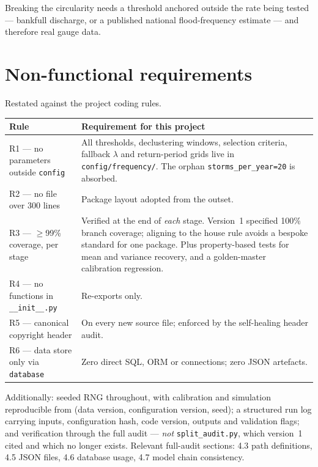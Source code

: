 \documentclass[11pt]{article}
\begin{document}
Breaking the circularity needs a threshold anchored outside the rate being
tested --- bankfull discharge, or a published national flood-frequency estimate
--- and therefore real gauge data.

\section{Non-functional requirements}

Restated against the project coding rules.

\begin{longtable}{@{}p{}p{}@{}}
\toprule
\textbf{Rule} & \textbf{Requirement for this project} \\
\midrule
\endhead
R1 --- no parameters outside \texttt{config} & All thresholds, declustering
windows, selection criteria, fallback $\lambda$ and return-period grids live in
\texttt{config/frequency/}. The orphan \texttt{storms\_per\_year=20} is
absorbed. \\
\addlinespace
R2 --- no file over 300 lines & Package layout adopted from the outset. \\
\addlinespace
R3 --- $\geq$99\% coverage, per stage & Verified at the end of \emph{each} stage.
Version~1 specified 100\% branch coverage; aligning to the house rule avoids a
bespoke standard for one package. Plus property-based tests for mean and
variance recovery, and a golden-master calibration regression. \\
\addlinespace
R4 --- no functions in \texttt{\_\_init\_\_.py} & Re-exports only. \\
\addlinespace
R5 --- canonical copyright header & On every new source file; enforced by the
self-healing header audit. \\
\addlinespace
R6 --- data store only via \texttt{database} & Zero direct SQL, ORM or
connections; zero JSON artefacts. \\
\bottomrule
\end{longtable}

\noindent Additionally: seeded RNG throughout, with calibration and simulation
reproducible from (data version, configuration version, seed); a structured run
log carrying inputs, configuration hash, code version, outputs and validation
flags; and verification through the full audit --- \emph{not}
\texttt{split\_audit.py}, which version~1 cited and which no longer exists.
Relevant full-audit sections: 4.3 path definitions, 4.5 JSON files, 4.6 database
usage, 4.7 model chain consistency.
\end{document}
